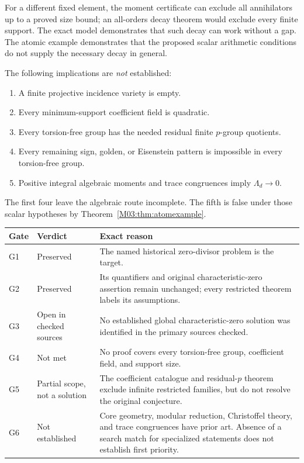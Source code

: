 \documentclass[11pt,a4paper,oneside]{report}
\theoremstyle{definition}
\theoremstyle{remark}
\begin{document}
For a different fixed element, the moment certificate can exclude all annihilators up to a proved size bound; an all-orders decay theorem would exclude every finite support. The exact model demonstrates that such decay can work without a gap. The atomic example demonstrates that the proposed scalar arithmetic conditions do not supply the necessary decay in general.

The following implications are \emph{not} established:
\begin{enumerate}
\item A finite projective incidence variety is empty.
\item Every minimum-support coefficient field is quadratic.
\item Every torsion-free group has the needed residual finite \(p\)-group quotients.
\item Every remaining sign, golden, or Eisenstein pattern is impossible in every torsion-free group.
\item Positive integral algebraic moments and trace congruences imply \(\Lambda_d\to0\).
\end{enumerate}
The first four leave the algebraic route incomplete. The fifth is false under those scalar hypotheses by Theorem~\ref{M03:thm:atomexample}.

\begin{center}\small
\begin{tabular}{@{}P{10mm}P{43mm}P{98mm}@{}}
\toprule Gate & Verdict & Exact reason\\
\midrule
G1 & Preserved & The named historical zero-divisor problem is the target.\\[4pt]
G2 & Preserved & Its quantifiers and original characteristic-zero assertion remain unchanged; every restricted theorem labels its assumptions.\\[4pt]
G3 & Open in checked sources & No established global characteristic-zero solution was identified in the primary sources checked.\\[4pt]
G4 & Not met & No proof covers every torsion-free group, coefficient field, and support size.\\[4pt]
G5 & Partial scope, not a solution & The coefficient catalogue and residual-\(p\) theorem exclude infinite restricted families, but do not resolve the original conjecture.\\[4pt]
G6 & Not established & Core geometry, modular reduction, Christoffel theory, and trace congruences have prior art. Absence of a search match for specialized statements does not establish first priority.\\
\bottomrule
\end{tabular}
\end{center}
\end{document}
